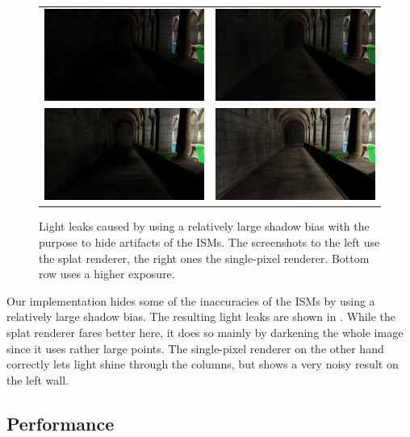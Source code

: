  \begin{figure}[htb]
 \centering
   \begin{tabular}{@{}cc@{}}
     \includegraphics[width=.22\textwidth]{../screenshots/bias_splat} &
     \includegraphics[width=.22\textwidth]{../screenshots/bias_single_pixel}\\
       \includegraphics[width=.22\textwidth]{../screenshots/bias_splat_exposure} &
       \includegraphics[width=.22\textwidth]{../screenshots/bias_single_pixel_exposure}
   \end{tabular}
   \caption{Light leaks caused by using a relatively large shadow bias with the purpose to hide artifacts of the ISMs. The screenshots to the left use the splat renderer, the right ones the single-pixel renderer. Bottom row uses a higher exposure.}
   \label{fig:results:bias}
 \end{figure}

 Our implementation hides some of the inaccuracies of the ISMs by using a relatively large shadow bias. The resulting light leaks are shown in . While the splat renderer fares better here, it does so mainly by darkening the whole image since it uses rather large points. The single-pixel renderer on the other hand correctly lets light shine through the columns, but shows a very noisy result on the left wall.




 \subsection{Performance}
  \vspace{0.1em}

